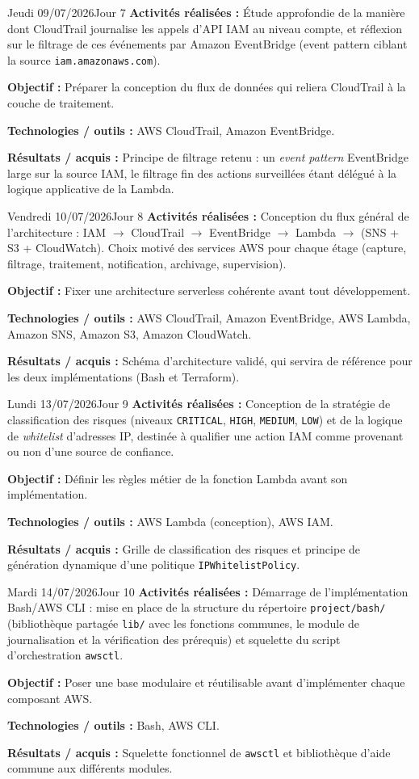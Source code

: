 \documentclass[11pt,a4paper]{article}
\newcommand{\journalfield}[2]{{\color{primaryblue}\textbf{#1 :}} #2\par\smallskip}
\begin{document}
\begin{journalday}{Jeudi 09/07/2026}{Jour 7}
\journalfield{Activités réalisées}{Étude approfondie de la manière dont CloudTrail journalise les appels d'API IAM au niveau compte, et réflexion sur le filtrage de ces événements par Amazon EventBridge (event pattern ciblant la source \texttt{iam.amazonaws.com}).}
\journalfield{Objectif}{Préparer la conception du flux de données qui reliera CloudTrail à la couche de traitement.}
\journalfield{Technologies / outils}{AWS CloudTrail, Amazon EventBridge.}
\journalfield{Résultats / acquis}{Principe de filtrage retenu : un \textit{event pattern} EventBridge large sur la source IAM, le filtrage fin des actions surveillées étant délégué à la logique applicative de la Lambda.}
\end{journalday}

\begin{journalday}{Vendredi 10/07/2026}{Jour 8}
\journalfield{Activités réalisées}{Conception du flux général de l'architecture : IAM $\rightarrow$ CloudTrail $\rightarrow$ EventBridge $\rightarrow$ Lambda $\rightarrow$ (SNS + S3 + CloudWatch). Choix motivé des services AWS pour chaque étage (capture, filtrage, traitement, notification, archivage, supervision).}
\journalfield{Objectif}{Fixer une architecture serverless cohérente avant tout développement.}
\journalfield{Technologies / outils}{AWS CloudTrail, Amazon EventBridge, AWS Lambda, Amazon SNS, Amazon S3, Amazon CloudWatch.}
\journalfield{Résultats / acquis}{Schéma d'architecture validé, qui servira de référence pour les deux implémentations (Bash et Terraform).}
\end{journalday}

\begin{journalday}{Lundi 13/07/2026}{Jour 9}
\journalfield{Activités réalisées}{Conception de la stratégie de classification des risques (niveaux \texttt{CRITICAL}, \texttt{HIGH}, \texttt{MEDIUM}, \texttt{LOW}) et de la logique de \textit{whitelist} d'adresses IP, destinée à qualifier une action IAM comme provenant ou non d'une source de confiance.}
\journalfield{Objectif}{Définir les règles métier de la fonction Lambda avant son implémentation.}
\journalfield{Technologies / outils}{AWS Lambda (conception), AWS IAM.}
\journalfield{Résultats / acquis}{Grille de classification des risques et principe de génération dynamique d'une politique \texttt{IPWhitelistPolicy}.}
\end{journalday}

\begin{journalday}{Mardi 14/07/2026}{Jour 10}
\journalfield{Activités réalisées}{Démarrage de l'implémentation Bash/AWS CLI : mise en place de la structure du répertoire \texttt{project/bash/} (bibliothèque partagée \texttt{lib/} avec les fonctions communes, le module de journalisation et la vérification des prérequis) et squelette du script d'orchestration \texttt{awsctl}.}
\journalfield{Objectif}{Poser une base modulaire et réutilisable avant d'implémenter chaque composant AWS.}
\journalfield{Technologies / outils}{Bash, AWS CLI.}
\journalfield{Résultats / acquis}{Squelette fonctionnel de \texttt{awsctl} et bibliothèque d'aide commune aux différents modules.}
\end{journalday}
\end{document}
